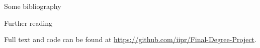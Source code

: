 \documentclass[final]{beamer}
\newlength{\onecolwid}
\begin{document}
\begin{frame}[t]
\begin{columns}[t]
\begin{column}{\onecolwid}
\begin{block}{Some bibliography}
{\begin{thebibliography}{ABR}
\end{thebibliography}	}

\end{block}
 
 
 
\begin{alertblock}{Further reading}
 
Full text and code can be found at \url{https://github.com/iipr/Final-Degree-Project}.
 
\end{alertblock}
 
 
 
\end{column} %
 
\end{columns} %
 
\end{frame} %
 
\end{document}
